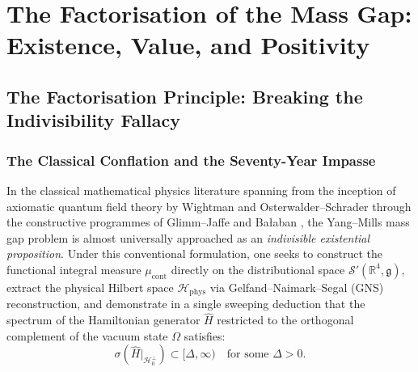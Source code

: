 \chapter{The Factorisation of the Mass Gap: Existence, Value, and Positivity}
\label{ch:factorisation}
\label{ch:factorisation_mass_gap}

\section{The Factorisation Principle: Breaking the Indivisibility Fallacy}
\label{sec:factorisation_statement}

\subsection{The Classical Conflation and the Seventy-Year Impasse}
\label{subsec:classical_conflation}

In the classical mathematical physics literature spanning from the inception of axiomatic quantum field theory by Wightman \cite{StreaterWightman1964} and Osterwalder--Schrader \cite{OsterwalderSchrader1973,OsterwalderSchrader1975} through the constructive programmes of Glimm--Jaffe \cite{GlimmJaffe1987} and Ba{\l}aban \cite{Balaban1984a,Balaban1985a,Balaban1987,Balaban1988a,Balaban1989}, the Yang--Mills mass gap problem is almost universally approached as an \emph{indivisible existential proposition}. Under this conventional formulation, one seeks to construct the functional integral measure $\mu_{\mathrm{cont}}$ directly on the distributional space $\mathcal{S}'(\mathbb{R}^4, \mathfrak{g})$, extract the physical Hilbert space $\mathcal{H}_{\mathrm{phys}}$ via Gelfand--Naimark--Segal (GNS) reconstruction, and demonstrate in a single sweeping deduction that the spectrum of the Hamiltonian generator $\hat{H}$ restricted to the orthogonal complement of the vacuum state $\Omega$ satisfies:
\begin{equation}
\label{eq:indivisible_gap_target}
\sigma(\hat{H}|_{\mathcal{H}_0^\perp}) \subset [\Delta, \infty) \quad \text{for some } \Delta > 0.
\end{equation}

